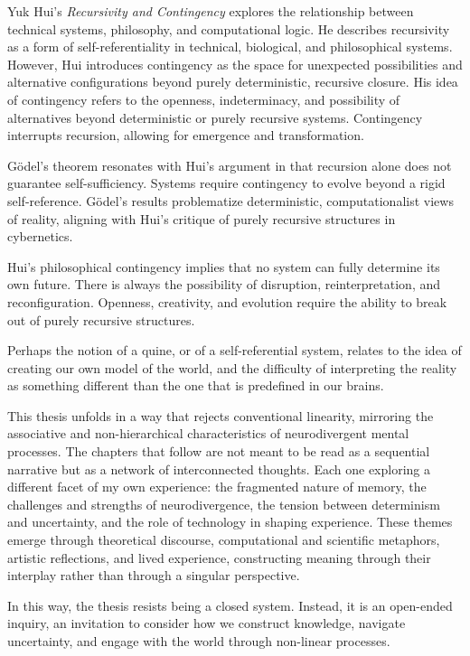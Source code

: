 Yuk Hui's \textit{Recursivity and Contingency} \citep{hui2019} explores the relationship between technical systems, philosophy, and computational logic. He describes recursivity as a form of self-referentiality in technical, biological, and philosophical systems. However, Hui introduces contingency as the space for unexpected possibilities and alternative configurations beyond purely deterministic, recursive closure. His idea of contingency refers to the openness, indeterminacy, and possibility of alternatives beyond deterministic or purely recursive systems. Contingency interrupts recursion, allowing for emergence and transformation.

Gödel's theorem resonates with Hui's argument in that recursion alone does not guarantee self-sufficiency. Systems require contingency to evolve beyond a rigid self-reference. Gödel's results problematize deterministic, computationalist views of reality, aligning with Hui's critique of purely recursive structures in cybernetics.

Hui's philosophical contingency implies that no system can fully determine its own future. There is always the possibility of disruption, reinterpretation, and reconfiguration. Openness, creativity, and evolution require the ability to break out of purely recursive structures.

Perhaps the notion of a quine, or of a self-referential system, relates to the idea of creating our own model of the world, and the difficulty of interpreting the reality as something different than the one that is predefined in our brains. 

This thesis unfolds in a way that rejects conventional linearity, mirroring the associative and non-hierarchical characteristics of neurodivergent mental processes. The chapters that follow are not meant to be read as a sequential narrative but as a network of interconnected thoughts. Each one exploring a different facet of my own experience: the fragmented nature of memory, the challenges and strengths of neurodivergence, the tension between determinism and uncertainty, and the role of technology in shaping experience. These themes emerge through theoretical discourse, computational and scientific metaphors, artistic reflections, and lived experience, constructing meaning through their interplay rather than through a singular perspective.

In this way, the thesis resists being a closed system. Instead, it is an open-ended inquiry, an invitation to consider how we construct knowledge, navigate uncertainty, and engage with the world through non-linear processes.

\footnotesize 
\begin{tcolorbox}[colback=gray!20, colframe=black, arc=2mm, boxrule=0.8pt]
\end{tcolorbox}
\normalsize